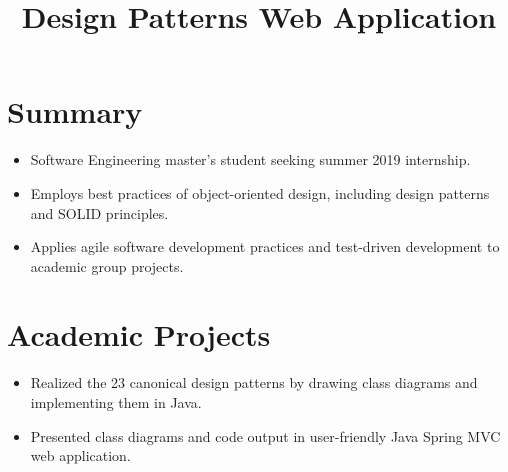 \documentclass[12pt]{res} %
\begin{document}
    \begin{resume}
 
      \section{Summary}
      \begin{itemize}[leftmargin=-0.4cm, rightmargin=0.8cm]
        \itemsep0em
        \item Software Engineering master's student seeking summer 2019 internship.
        \item Employs best practices of object-oriented design, including design patterns and SOLID principles.
        \item Applies agile software development practices and test-driven development to academic group projects.
        \end{itemize}
        \vspace{-10pt}
      
        \section{Academic Projects}
          \vspace{2pt}

          \title{\textbf{Design Patterns Web Application}}
          \begin{position}
            \vspace{-14pt}
            \begin{itemize}[leftmargin=-0.4cm, rightmargin=0.8cm]
            \itemsep0em
            \item Realized the 23 canonical design patterns by drawing class diagrams and implementing them in Java.
            \item Presented class diagrams and code output in user-friendly Java Spring MVC web application.
            \end{itemize}
          \end{position}
          \vspace{-10pt}


\end{resume}
\end{document}
